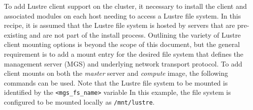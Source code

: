 To add Lustre client support on the cluster, it necessary to install the client
and associated modules on each host needing to access a Lustre file system.  In
this recipe, it is assumed that the Lustre file system is hosted by servers
that are pre-existing and are not part of the install process. Outlining the
variety of Lustre client mounting options is beyond the scope of this document,
but the general requirement is to add a mount entry for the desired file system
that defines the management server (MGS) and underlying network transport
protocol.  To add client mounts on both the {\em master} server and {\em
compute} image, the following commands can be used. Note that the Lustre file
system to be mounted is identified by the \texttt{<mgs\_fs\_name>} variable 
In this example, the file system is configured to be mounted locally
as \texttt{/mnt/lustre}.
